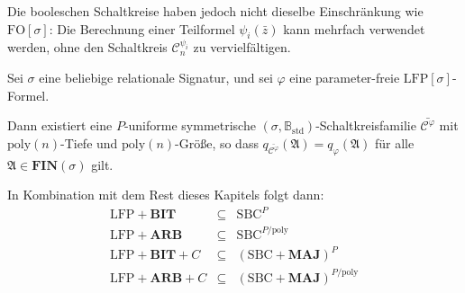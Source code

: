 Die booleschen Schaltkreise haben jedoch nicht dieselbe Einschränkung
wie $\mathrm{FO}\left[\sigma\right]$: Die Berechnung einer Teilformel
$\psi_{i}\left(\bar{z}\right)$ kann mehrfach verwendet werden, ohne
den Schaltkreis $\mathcal{C}_{n}^{\psi_{i}}$ zu vervielfältigen.
\begin{lem}
\label{lem:lfp-circ}Sei $\sigma$ eine beliebige relationale Signatur,
und sei $\varphi$ eine parameter-freie $\mathrm{LFP}\left[\sigma\right]$-Formel.

Dann existiert eine $P$-uniforme symmetrische $\left(\sigma,\mathbb{B}_{\mathrm{std}}\right)$-Schaltkreisfamilie
$\bar{\mathcal{C}^{\varphi}}$ mit $\mathrm{poly}\left(n\right)$-Tiefe
und $\mathrm{poly}\left(n\right)$-Größe, so dass $q_{\bar{\mathcal{C}^{\varphi}}}\left(\mathfrak{A}\right)=q_{\varphi}\left(\mathfrak{A}\right)$
für alle $\mathfrak{A}\in\mathbf{FIN}\left(\sigma\right)$ gilt.
\end{lem}
In Kombination mit dem Rest dieses Kapitels folgt dann:
\begin{eqnarray*}
\mathrm{LFP}+\mathbf{BIT} & \subseteq & \mathrm{SBC}^{P}\\
\mathrm{LFP}+\mathbf{ARB} & \subseteq & \mathrm{SBC}^{P/\mathrm{poly}}\\
\mathrm{LFP}+\mathbf{BIT}+C & \subseteq & \left(\mathrm{SBC}+\mathbf{MAJ}\right)^{P}\\
\mathrm{LFP}+\mathbf{ARB}+C & \subseteq & \left(\mathrm{SBC}+\mathbf{MAJ}\right)^{P/\mathrm{poly}}
\end{eqnarray*}

